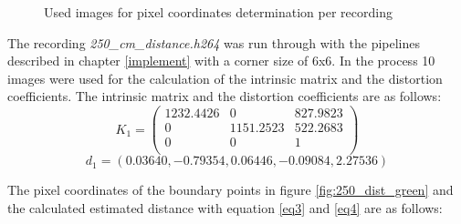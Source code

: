 \begin{figure}[H]
\begin{minipage}{\textwidth}
\begin{subcolumns}[0.4\textwidth]
        \end{subcolumns}
    \end{minipage}
    \caption{Used images for pixel coordinates determination per recording}
    \label{group_fig:dist_green}
\end{figure}

\newpage

The recording \textit{250\_cm\_distance.h264} was run through with the pipelines described in chapter \ref{implement} with a corner size of 6x6. In the process 10 images were used for the calculation of the intrinsic matrix and the distortion coefficients. The intrinsic matrix and the distortion coefficients are as follows:
\vspace{1mm}
\begin{equation*}
    K_1 = 
    \begin{pmatrix}
        1232.4426 & 0 & 827.9823\\
        0 & 1151.2523 & 522.2683\\
        0 & 0 & 1\\
    \end{pmatrix}
\end{equation*}
\vspace{1mm}
\begin{equation*}
    d_1 = (0.03640, -0.79354,  0.06446, -0.09084,  2.27536)
\end{equation*}

The pixel coordinates of the boundary points in figure \ref{fig:250_dist_green} and the calculated estimated distance with equation \ref{eq3} and \ref{eq4} are as follows:

